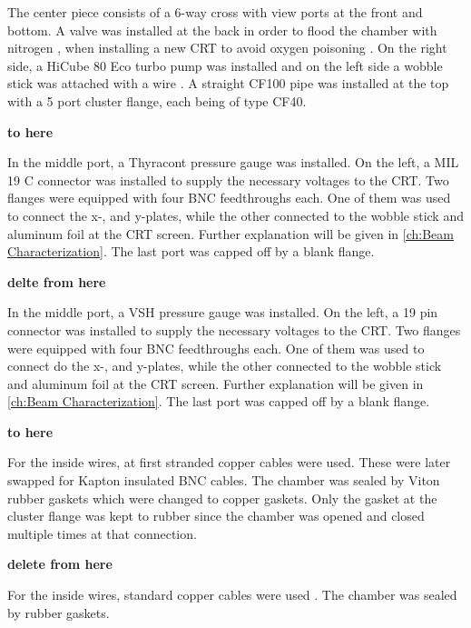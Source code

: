 The center piece consists of a 6-way cross with view ports at the front and bottom. A valve was installed at the back in order to flood the chamber with nitrogen , when installing a new CRT to avoid oxygen poisoning . On the right side, a HiCube 80 Eco turbo pump was installed and on the left side a wobble stick was attached with a wire . A straight CF100 pipe  was installed at the top with a 5 port cluster flange, each being of type CF40. 

\textbf{to here}
 
In the middle port, a Thyracont  pressure gauge was installed. On the left, a MIL 19 C connector was installed to supply the necessary voltages to the CRT. Two flanges were equipped with four BNC feedthroughs each. One of them was used to connect the x-, and y-plates, while the other connected to the wobble stick and aluminum foil at the CRT screen. Further explanation will be given in \cref{ch:Beam Characterization}. The last port was capped off by a blank flange.

\textbf{delte from here}

In the middle port, a VSH   pressure gauge was installed. On the left, a 19 pin connector   was installed to supply the necessary voltages to the CRT. Two flanges were equipped with four BNC feedthroughs each. One of them was used to connect do the x-, and y-plates, while the other connected to the wobble stick and aluminum foil at the CRT screen. Further explanation will be given in \cref{ch:Beam Characterization}. The last port was capped off by a blank flange.

\textbf{to here}
 
For the inside wires, at first stranded copper cables were used. These were later swapped for Kapton insulated BNC cables. The chamber was sealed by Viton rubber gaskets which were changed to copper gaskets. Only the gasket at the cluster flange was kept to rubber since the chamber was opened and closed multiple times at that connection.

\textbf{delete from here}

For the inside wires, standard copper cables were used . The chamber was sealed by rubber  gaskets.

